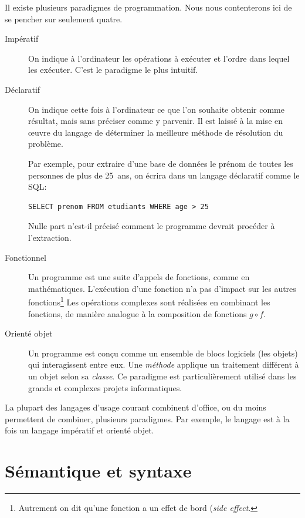 Il existe plusieurs paradigmes de programmation. Nous nous
contenterons ici de se pencher sur seulement quatre.

\begin{description}
\item[Impératif]  On indique à l'ordinateur
  les opérations à exécuter et l'ordre dans lequel les exécuter. C'est
  le paradigme le plus intuitif.
\item[Déclaratif]  On indique cette fois à
  l'ordinateur ce que l'on souhaite obtenir comme résultat, mais sans
  préciser comme y parvenir. Il est laissé à la mise en œuvre du
  langage de déterminer la meilleure méthode de résolution du
  problème.

  Par exemple, pour extraire d'une base de données  le
  prénom de toutes les personnes de plus de 25~ans, on écrira dans un
  langage déclaratif comme le SQL:
\begin{Schunk}
\begin{Verbatim}
SELECT prenom FROM etudiants WHERE age > 25
\end{Verbatim}
\end{Schunk}
  Nulle part n'est-il précisé comment le programme devrait procéder à
  l'extraction.
\item[Fonctionnel]  Un programme est une
  suite d'appels de fonctions, comme en mathématiques. L'exécution
  d'une fonction n'a pas d'impact sur les autres fonctions\footnote{%
    Autrement on dit qu'une fonction a un effet de bord (\emph{side
      effect}.} %
  Les opérations complexes sont réalisées en combinant les fonctions,
  de manière analogue à la composition de fonctions $g \circ f$.
\item[Orienté objet]  Un programme est
  conçu comme un ensemble de blocs logiciels (les objets) qui
  interagissent entre eux. Une \emph{méthode} applique un traitement
  différent à un objet selon sa \emph{classe}. Ce paradigme est
  particulièrement utilisé dans les grands et complexes projets
  informatiques.
\end{description}

La plupart des langages d'usage courant combinent d'office, ou du
moins permettent de combiner, plusieurs paradigmes. Par exemple, le
langage {\Cpp} est à la fois un langage impératif et orienté objet.


\section{Sémantique et syntaxe}
\label{sec:informatique:semantique}

